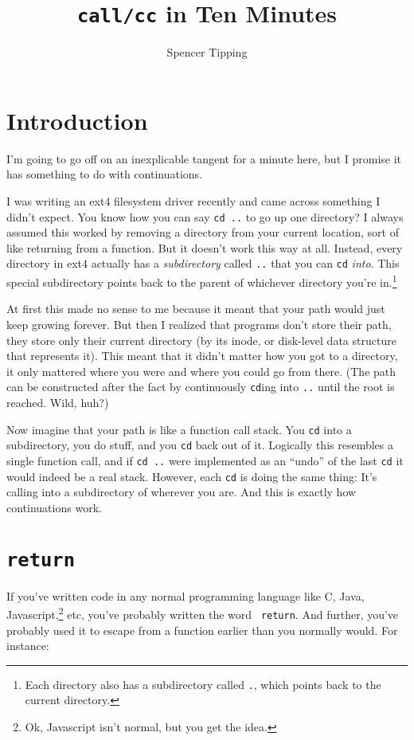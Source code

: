 \documentclass{article}
\title{{\tt call/cc} in Ten Minutes}
\author{Spencer Tipping}
\begin{document}
\maketitle{}
\tableofcontents{}

\section{Introduction}
  I'm going to go off on an inexplicable tangent for a minute here, but I promise it has something to do with continuations.

  I was writing an ext4 filesystem driver recently and came across something I didn't expect. You know how you can say {\tt cd ..} to go up one directory? I always assumed this worked by
  removing a directory from your current location, sort of like returning from a function. But it doesn't work this way at all. Instead, every directory in ext4 actually has a {\em
  subdirectory} called {\tt ..} that you can {\tt cd} {\em into}. This special subdirectory points back to the parent of whichever directory you're in.\footnote{Each directory also has a
  subdirectory called {\tt .}, which points back to the current directory.}

  At first this made no sense to me because it meant that your path would just keep growing forever. But then I realized that programs don't store their path, they store only their current
  directory (by its inode, or disk-level data structure that represents it). This meant that it didn't matter how you got to a directory, it only mattered where you were and where you could go
  from there. (The path can be constructed after the fact by continuously {\tt cd}ing into {\tt ..} until the root is reached. Wild, huh?)

  Now imagine that your path is like a function call stack. You {\tt cd} into a subdirectory, you do stuff, and you {\tt cd} back out of it. Logically this resembles a single function call,
  and if {\tt cd ..} were implemented as an ``undo'' of the last {\tt cd} it would indeed be a real stack. However, each {\tt cd} is doing the same thing: It's calling into a subdirectory of
  wherever you are. And this is exactly how continuations work.

\section{{\tt return}}
  If you've written code in any normal programming language like C, Java, Javascript,\footnote{Ok, Javascript isn't normal, but you get the idea.} etc, you've probably written the word {\tt
  return}. And further, you've probably used it to escape from a function earlier than you normally would. For instance:
\end{document}
